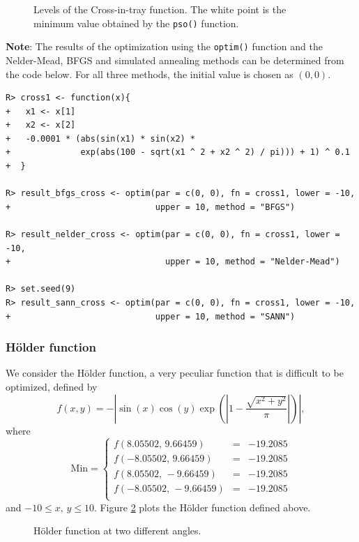 \documentclass[10pt,letterpaper]{article}
\begin{document}
\begin{figure}[H]
\centering
\caption{Levels of the Cross-in-tray function.
The white point is the minimum value obtained by the \texttt{pso()} function.}
\label{curves_cross}
\end{figure}

\noindent
\textbf{Note}: The results of the optimization using the \texttt{optim()} function and the Nelder-Mead, BFGS and simulated annealing
methods can be determined from the code below.
For all three  methods, the initial value is chosen as $(0, 0)$.
\begin{verbatim}
R> cross1 <- function(x){
+   x1 <- x[1]
+   x2 <- x[2]
+   -0.0001 * (abs(sin(x1) * sin(x2) *
+              exp(abs(100 - sqrt(x1 ^ 2 + x2 ^ 2) / pi))) + 1) ^ 0.1
+  }

R> result_bfgs_cross <- optim(par = c(0, 0), fn = cross1, lower = -10,
+                             upper = 10, method = "BFGS")

R> result_nelder_cross <- optim(par = c(0, 0), fn = cross1, lower = -10,
+                               upper = 10, method = "Nelder-Mead")

R> set.seed(9)
R> result_sann_cross <- optim(par = c(0, 0), fn = cross1, lower = -10,
+                             upper = 10, method = "SANN")
\end{verbatim}

\subsubsection{H\"{o}lder function}

We consider the H\"{o}lder function, a very peculiar function that is difficult to be optimized, defined by
$$f(x,y) = - \left| \sin(x) \cos(y) \exp \left( \left| 1 - \frac{\sqrt{x^2 + y^2}}{\pi}  \right|  \right)   \right|,$$
where
$$
\mathrm{Min} = \left\{
\begin{array}{ccc}
f(8.05502,\, 9.66459) & = & -19.2085
\\
f(-8.05502,\, 9.66459) & = & -19.2085
\\
f(8.05502,\, -9.66459) & = & -19.2085
\\
f(-8.05502,\,-9.66459) & = & -19.2085
\\
\end{array}
\right.
$$
and $-10 \leq x,\, y \leq 10$.
Figure \ref{fig:holder}  plots the H\"{o}lder function defined above.

\begin{figure}[H]
	\centering
	\subfigure{
		\label{fig:holder2}
	}
	\subfigure{
		\label{fig:holder1}
	}
	\caption{H\"{o}lder function at two different angles.}
	\label{fig:holder}
\end{figure}
\end{document}

